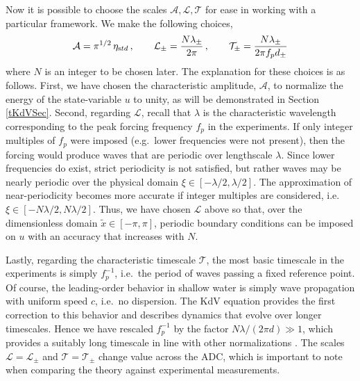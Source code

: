 \documentclass[11pt]{article}
\newcommand{\freqp}{f_p}
\newcommand{\etastd}{\eta_{\text std}}
\newcommand{\depth}{d}
\newcommand{\dupdn}{\depth_{\pm}}
\newcommand{\lam}{\lambda}
\newcommand{\lamupdn}{\lam_{\pm}}
\newcommand{\lamfac}{N}
\newcommand{\ampscale}{\mathcal{A}}
\newcommand{\lengthscale}{\mathcal{L}}
\newcommand{\timescale}{\mathcal{T}}
\begin{document}
Now it is possible to choose the scales $\ampscale, \lengthscale, \timescale$ for ease in working with a particular framework. We make the following choices,
\begin{align}
\label{scales}
\ampscale = \pi^{1/2} \, \etastd \, , \qquad
\lengthscale_{\pm} = \frac{\lamfac \lamupdn}{2 \pi} \, , \qquad
\timescale_{\pm} = \frac{\lamfac \lamupdn}{2 \pi \freqp \dupdn}
\end{align}
where $\lamfac$ is an integer to be chosen later. 
The explanation for these choices is as follows. First, we have chosen the characteristic amplitude, $\ampscale$, to normalize the energy of the state-variable $u$ to unity, as will be demonstrated in Section \ref{tKdVSec}. Second, regarding $\lengthscale$, recall that $\lam$ is the characteristic wavelength corresponding to the peak forcing frequency $\freqp$ in the experiments. If only integer multiples of $\freqp$ were imposed (e.g.~lower frequencies were not present), then the forcing would produce waves that are periodic over lengthscale $\lam$. Since lower frequencies do exist, strict periodicity is not satisfied, but rather waves may be nearly periodic over the physical domain $\xi \in [-\lam/2, \lam/2]$. The approximation of near-periodicity becomes more accurate if integer multiples are considered, i.e.~$\xi \in [-\lamfac \lam/2, \lamfac \lam/2]$. Thus, we have chosen $\lengthscale$ above so that, over the dimensionless domain $\tilde{x} \in [-\pi, \pi]$, periodic boundary conditions can be  imposed on $u$ with an accuracy that increases with $\lamfac$. 

	Lastly, regarding the characteristic timescale $\timescale$, the most basic timescale in the experiments is simply $\freqp^{-1}$, i.e.~the period of waves passing a fixed reference point. Of course, the leading-order behavior in shallow water is simply wave propagation with uniform speed $c$, i.e.~no dispersion. The KdV equation provides the first correction to this behavior and describes dynamics that evolve over longer timescales. Hence we have rescaled $\freqp^{-1}$ by the factor $N \lam/(2 \pi \depth) \gg 1$, which provides a suitably long timescale in line with other normalizations \cite{johnson1997modern}. The scales $\lengthscale = \lengthscale_{\pm}$ and $\timescale = \timescale_{\pm}$ change value across the ADC, which is important to note when comparing the theory against experimental measurements.
\end{document}
